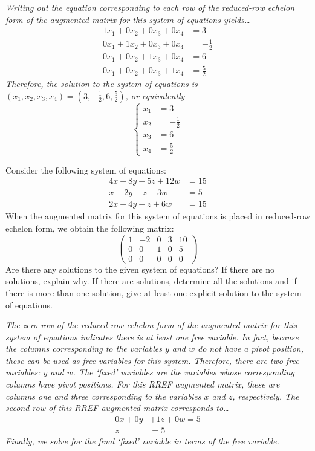 \documentclass[12pt,letterpaper]{exam}
\begin{document}
\begin{questions}
{\itshape Writing out the equation corresponding to each row of the reduced-row echelon form of the augmented matrix for this system of equations yields\dots
	\[
	\begin{aligned}
	1x_1 + 0x_2 + 0x_3 + 0x_4&= 3 \\
	0x_1 + 1x_2 + 0x_3 + 0x_4&= -\frac{1}{2} \\
	0x_1 + 0x_2 + 1x_3 + 0x_4&= 6 \\
	0x_1 + 0x_2 + 0x_3 + 1x_4&= \frac{5}{2}
	\end{aligned}
	\]
Therefore, the solution to the system of equations is $(x_1, x_2, x_3, x_4)= (3, -\frac{1}{2}, 6, \frac{5}{2})$, or equivalently
	\[
	\left\{
	\begin{aligned}
	x_1&= 3 \\
	x_2&= -\frac{1}{2} \\
	x_3&= 6 \\
	x_4&= \frac{5}{2}
	\end{aligned} \right.
	\] 
}



\newpage
\question[10] Consider the following system of equations:
	\[
	\begin{aligned}
	4x - 8y - 5z + 12w&= 15 \\
	x - 2y - z + 3w&= 5 \\
	2x - 4y - z + 6w&= 15
	\end{aligned}
	\]
When the augmented matrix for this system of equations is placed in reduced-row echelon form, we obtain the following matrix:
	\[
	\begin{pmatrix}
	1 & -2 & 0 & 3 & 10 \\
	0 & 0 & 1 & 0 & 5 \\
	0 & 0 & 0 & 0 & 0 
	\end{pmatrix}
	\]
Are there any solutions to the given system of equations? If there are no solutions, explain why. If there are solutions, determine all the solutions and if there is more than one solution, give at least one explicit solution to the system of equations. \pvspace{0.5cm}

{\itshape The zero row of the reduced-row echelon form of the augmented matrix for this system of equations indicates there is at least one free variable. In fact, because the columns corresponding to the variables $y$ and $w$ do not have a pivot position, these can be used as free variables for this system. Therefore, there are two free variables: $y$ and $w$. The `fixed' variables are the variables whose corresponding columns have pivot positions. For this RREF augmented matrix, these are columns one and three corresponding to the variables $x$ and $z$, respectively. The second row of this RREF augmented matrix corresponds to\dots
	\[
	\begin{aligned}
	0x + 0y &+ 1z + 0w= 5 \\
	z&= 5
	\end{aligned}
	\]
Finally, we solve for the final `fixed' variable in terms of the free variable. 


}
\end{questions}
\end{document}
